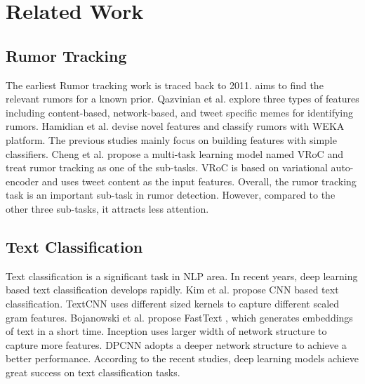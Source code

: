\section{Related Work}
\label{sec:related}

\subsection{Rumor Tracking}
\label{sec:rumortracking}
The earliest Rumor tracking work is traced back to 2011. \cite{DBLP:journals/csur/ZubiagaABLP18} aims to find the relevant rumors for a known prior. Qazvinian et al. \cite{DBLP:conf/emnlp/QazvinianRRM11} explore three types of features including content-based, network-based, and tweet specific memes for identifying rumors. Hamidian et al. \cite{DBLP:journals/corr/abs-1912-08926} devise novel features and classify rumors with WEKA platform. The previous studies mainly focus on building features with simple classifiers. Cheng et al. \cite{DBLP:conf/www/ChengNB20} propose a multi-task learning model named VRoC and treat rumor tracking as one of the sub-tasks. VRoC is based on variational auto-encoder and uses tweet content as the input features. Overall, the rumor tracking task is an important sub-task in rumor detection. However, compared to the other three sub-tasks, it attracts less attention.

\subsection{Text Classification}
\label{sec:textclassification}
Text classification is a significant task in NLP area. In recent years, deep learning based text classification develops rapidly. Kim et al. \cite{DBLP:conf/emnlp/Kim14} propose CNN based text classification. TextCNN uses different sized kernels to capture different scaled gram features. Bojanowski et al. propose FastText \cite{DBLP:journals/tacl/BojanowskiGJM17}, which generates embeddings of text in a short time. Inception \cite{DBLP:journals/corr/SzegedyLJSRAEVR14} uses larger width of network structure to capture more features. DPCNN \cite{DBLP:conf/acl/JohnsonZ17} adopts a deeper network structure to achieve a better performance. According to the recent studies, deep learning models achieve great success on text classification tasks.

